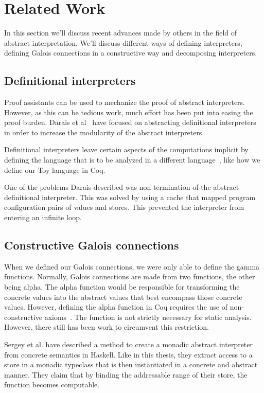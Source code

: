\chapter{Related Work}
In this section we'll discuss recent advances made by others in the field of 
abstract interpretation. We'll discuss different ways of defining interpreters,
defining Galois connections in a constructive way and decomposing interpreters.

\section{Definitional interpreters}
Proof assistants can be used to mechanize the proof of abstract interpreters.
However, as this can be tedious work, much effort has been put into easing the
proof burden. Darais et al~\cite{darais2017abstracting} have focused on
abstracting definitional interpreters in order to increase the modularity of
the abstract interpreters. 

Definitional interpreters leave certain aspects of the computations implicit 
by defining the language that is to be analyzed in a different 
language~\cite{reynolds1972definitional}, like how we define our Toy language 
in Coq. 

One of the problems Darais described was non-termination of the abstract
definitional interpreter. This was solved by using a cache that mapped program
configuration pairs of values and stores. This prevented the interpreter from
entering an infinite loop.

\section{Constructive Galois connections}
When we defined our Galois connections, we were only able to define the gamma
functions. Normally, Galois connections are made from two functions, the
other being alpha. The alpha function would be responsible for transforming
the concrete values into the abstract values that best encompass those concrete
values. However, defining the alpha function in Coq requires the use of
non-constructive axioms~\cite{Monniaux3}. The  function is not
strictly necessary for static analysis. However, there still has been work to
circumvent this restriction.

Sergey et al.\cite{sergey2013monadic} have described a method to create a
monadic abstract interpreter
from concrete semantics in Haskell. Like in this thesis, they extract access to a store in a monadic typeclass that is then instantiated in a
concrete and abstract manner. They claim that by binding the addressable range
of their store, the  function becomes computable. 

